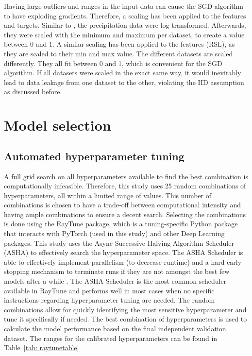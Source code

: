\documentclass[twocolumn, 10pt, a4paper]{memoir}
\begin{document}
		Having large outliers and ranges in the input data can cause the SGD algorithm to have exploding gradients. Therefore, a scaling has been applied to the features and targets. Similar to \cite{Kilmartin1972}, the precipitation data were log-transformed. Afterwards, they were scaled with the minimum and maximum per dataset, to create a value between 0 and 1. A similar scaling has been applied to the features (RSL), as they are scaled to their min and max value. 
		The different datasets are scaled differently. They all fit between 0 and 1, which is convenient for the SGD algorithm. If all datasets were scaled in the exact same way, it would inevitably lead to data leakage from one dataset to the other, violating the IID assumption as discussed before. 
		

	\section{Model selection} \label{modelselection}
		\subsection{Automated hyperparameter tuning} \label{RayTune}
		A full grid search on all hyperparameters available to find the best combination is computationally infeasible. Therefore, this study uses 25 random combinations of hyperparameters, all within a limited range of values. This number of combinations is chosen to have a trade-off between computational intensity and having ample combinations to ensure a decent search.
		Selecting the combinations is done using the RayTune package, which is a tuning-specific Python package that interacts with PyTorch (used in this study) and other Deep Learning packages. This study uses the Async Successive Halving Algorithm Scheduler (ASHA) to effectively search the hyperparameter space. The ASHA Scheduler is able to effectively implement parallelism (to decrease runtime) and a hard early stopping mechanism to terminate runs if they are not amongst the best few models after a while \cite{Li2018}. The ASHA Scheduler is the most common scheduler available in RayTune and performs well in most cases when no specific instructions regarding hyperparameter tuning are needed.  
		The random combinations allow for quickly identifying the most sensitive hyperparameter and tune it specifically if needed. The best combination of hyperparameters is used to calculate the model performance based on the final independent validation dataset. The ranges for the calibrated hyperparameters can be found in Table~\ref{tab: raytunetable}
		
\end{document}
